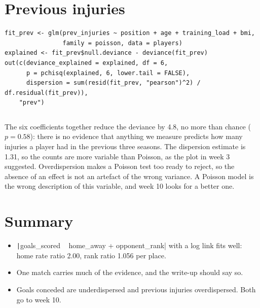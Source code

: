 \documentclass[12pt,notitlepage]{report}
\begin{document}
\section{Previous injuries}

\begin{verbatim}
fit_prev <- glm(prev_injuries ~ position + age + training_load + bmi,
                family = poisson, data = players)
explained <- fit_prev$null.deviance - deviance(fit_prev)
out(c(deviance_explained = explained, df = 6,
      p = pchisq(explained, 6, lower.tail = FALSE),
      dispersion = sum(resid(fit_prev, "pearson")^2) / df.residual(fit_prev)),
    "prev")
\end{verbatim}

\inputminted{text}{output/prev.txt}

The six coefficients together reduce the deviance by 4.8, no more than chance
($p = 0.58$): there is no evidence that anything we measure predicts how many
injuries a player had in the previous three seasons. The dispersion estimate
is 1.31, so the counts are more variable than Poisson, as the plot in week 3
suggested. Overdispersion makes a Poisson test too ready to reject, so the
absence of an effect is not an artefact of the wrong variance. A Poisson
model is the wrong description of this variable, and week 10 looks for a
better one.

\section{Summary}

\begin{itemize}
  \item \texttt|goals_scored ~ home_away + opponent_rank| with a log
    link fits well: home rate ratio 2.00, rank ratio 1.056 per place.
  \item One match carries much of the evidence, and the write-up should say
    so.
  \item Goals conceded are underdispersed and previous injuries
    overdispersed. Both go to week 10.
\end{itemize}
\end{document}
